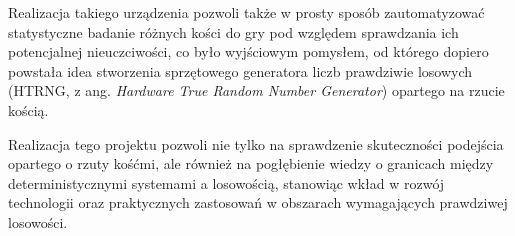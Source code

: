 Realizacja takiego urządzenia pozwoli także w prosty sposób zautomatyzować statystyczne badanie różnych
kości do gry pod względem sprawdzania ich potencjalnej nieuczciwości,
co było wyjściowym pomysłem, od którego dopiero powstała idea stworzenia sprzętowego generatora liczb prawdziwie losowych 
(HTRNG, z ang. \textit{Hardware True Random Number Generator}) opartego na rzucie kością.

Realizacja tego projektu pozwoli nie tylko na sprawdzenie skuteczności podejścia opartego o rzuty kośćmi,
ale również na pogłębienie wiedzy o granicach między deterministycznymi systemami a losowością,
stanowiąc wkład w rozwój technologii oraz praktycznych zastosowań w obszarach wymagających prawdziwej losowości.

